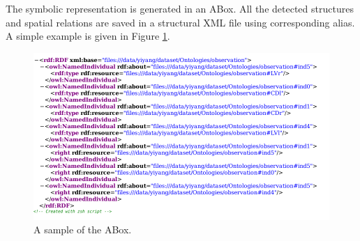 \documentclass{article}
\begin{document}
The symbolic representation is generated in an ABox. All the detected structures and spatial relations are saved in a structural XML file using corresponding alias.
A simple example is given in Figure \ref{fig:owlfile}.
\begin{figure}[h]
 \centering
 \includegraphics[width=.8\textwidth]{./figures/xml_screenshot.png}
 \caption{\label{fig:owlfile}A sample of the ABox.}
\end{figure}
\end{document}
